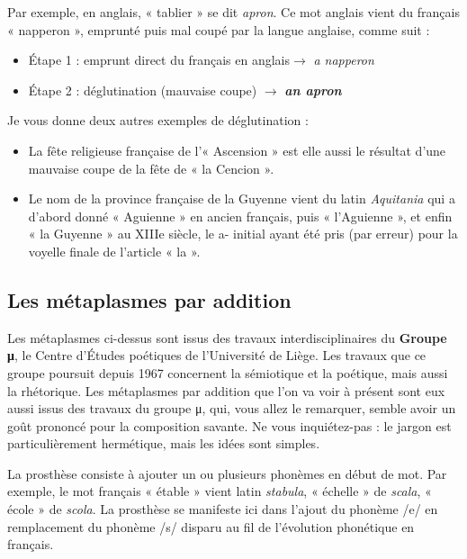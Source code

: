 Par exemple, en anglais, « tablier » se dit \textit{apron}. Ce mot anglais vient du français « napperon »,
emprunté puis mal coupé par la langue anglaise, comme suit :
\begin{itemize}
\item Étape 1 : emprunt direct du français en anglais$\rightarrow$ \textit{a napperon}
\item Étape 2 : déglutination (mauvaise coupe) $\rightarrow$ \textbf{\textit{an apron}}
\end{itemize}
Je vous donne deux autres exemples de déglutination :
\begin{itemize}
\item La fête religieuse française de l’« Ascension » est elle aussi le résultat d’une mauvaise coupe de la fête de « la Cencion ».
\item Le nom de la province française de la Guyenne vient du latin \textit{Aquitania} qui a d’abord donné « Aguienne » en ancien français, puis « l’Aguienne », et enfin « la Guyenne » au XIIIe siècle, le a- initial ayant été pris (par erreur) pour la voyelle finale de l’article « la ».
\end{itemize}

\subsection{Les métaplasmes par addition}
Les métaplasmes ci-dessus sont issus des travaux interdisciplinaires du \textbf{Groupe μ}, le Centre d’Études poétiques de l’Université de Liège. Les travaux que ce groupe poursuit depuis 1967 concernent la sémiotique et la poétique, mais aussi la rhétorique. Les métaplasmes par addition que l’on va voir à présent sont eux aussi issus des travaux du groupe μ, qui, vous allez le remarquer, semble avoir un goût prononcé pour la composition savante. Ne vous inquiétez-pas : le jargon est particulièrement hermétique, mais les idées sont simples.

La prosthèse consiste à ajouter un ou plusieurs phonèmes en début de mot. Par exemple, le mot français « étable » vient latin \textit{stabula}, « échelle » de \textit{scala}, « école » de \textit{scola}. La prosthèse se manifeste ici dans l’ajout du phonème /e/ en remplacement du phonème /s/ disparu au fil de l’évolution phonétique en français.

